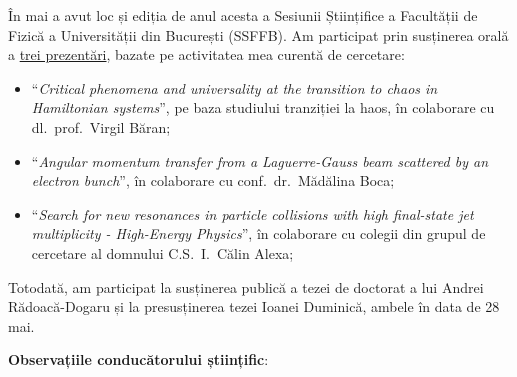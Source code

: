 În mai a avut loc și ediția de anul acesta a Sesiunii Științifice a Facultății de Fizică a Universității din București (SSFFB). Am participat prin susținerea orală a \href{github.com/GabrielMajeri/ssffb-2026-presentations/}{trei prezentări}, bazate pe activitatea mea curentă de cercetare:
\begin{itemize}
    \item ``\emph{Critical phenomena and universality at the transition to chaos in Hamiltonian systems}'', pe baza studiului tranziției la haos, în colaborare cu dl.~prof.~Virgil Băran;

    \item ``\emph{Angular momentum transfer from a Laguerre-Gauss beam scattered by an electron bunch}'', în colaborare cu conf.~dr.~Mădălina Boca;

    \item ``\emph{Search for new resonances in particle collisions with high final-state jet multiplicity - High-Energy Physics}'', în colaborare cu colegii din grupul de cercetare al domnului C.S.~I.~Călin Alexa;
\end{itemize}

Totodată, am participat la susținerea publică a tezei de doctorat a lui Andrei Rădoacă-Dogaru și la presusținerea tezei Ioanei Duminică, ambele în data de 28 mai.

\textbf{Observațiile conducătorului științific}:

